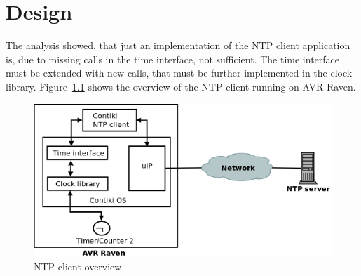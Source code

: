 
\chapter{Design}
The analysis showed, that just an implementation of the
NTP client application is, due to missing calls in the time interface, not sufficient.
The time interface must be extended with new calls,
that must be further implemented in the clock library.
Figure~\ref{fig:design-overview} shows the overview of the NTP client running on AVR Raven.

\begin{figure}[H]
  \centering
  \includegraphics[width=13cm,keepaspectratio]{fig/design.png}
  \caption{NTP client overview} %
  \label{fig:design-overview} %
\end{figure}





%


